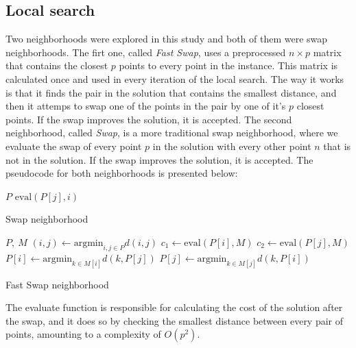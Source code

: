 \documentclass[preprint,12pt]{elsarticle}
\begin{document}
\subsection{Local search}
Two neighborhoods were explored in this study and both of them were swap neighborhoods. The firt one, called \textit{Fast Swap}, uses a preprocessed $n\times p$ matrix that contains the closest $p$ points to every point in the instance. This matrix is calculated once and used in every iteration of the local search. The way it works is that it finds the pair in the solution that contains the smallest distance, and then it attemps to swap one of the points in the pair by one of it's $p$ closest points. If the swap improves the solution, it is accepted.
The second neighborhood, called \textit{Swap}, is a more traditional swap neighborhood, where we evaluate the swap of every point $p$ in the solution with every other point $n$ that is not in the solution. If the swap improves the solution, it is accepted.
The pseudocode for both neighborhoods is presented below:
\begin{algorithm}[H]
    \label{alg:swap}
    \begin{algorithmic}[1]
        \Require $P$ 
                \State $\text{eval}(P[j], i)$ 
            \EndFor
        \EndFor
    \end{algorithmic}
    \caption{Swap neighborhood}
\end{algorithm}

\begin{algorithm}[H]
    \label{alg:fastswap}
    \begin{algorithmic}[1]
        \Require $P,\ M$ 
        \State $(i, j) \leftarrow \text{argmin}_{i,j \in P} d(i, j)$ 
        \State $c_1 \leftarrow \text{eval}(P[i], M)$ 
        \State $c_2 \leftarrow \text{eval}(P[j], M)$ 
            \State $P[i] \leftarrow \text{argmin}_{k \in M[i]} d(k, P[j])$ 
        \Else
            \State $P[j] \leftarrow \text{argmin}_{k \in M[j]} d(k, P[i])$ 
        \EndIf
    \end{algorithmic}
    \caption{Fast Swap neighborhood}
\end{algorithm}
The evaluate function is responsible for calculating the cost of the solution after the swap, and it does so by checking the smallest distance between every pair of points, amounting to a complexity of $O(p^2)$.
\end{document}
